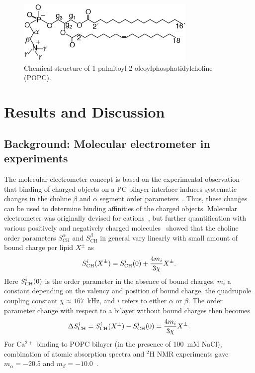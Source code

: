 \documentclass[pre,aps,floatfix,authordate1-4,twocolumn]{revtex4-1}
\begin{document}
\begin{figure}[]
  \centering
  \includegraphics[width=8.6cm]{../Fig/POPCstructure.eps}

  \caption{\label{POPCstructure}
    Chemical structure of 1-palmitoyl-2-oleoylphosphatidylcholine (POPC).}
  
\end{figure}





\section{Results and Discussion}

\subsection{Background: Molecular electrometer in experiments}\label{conceptinexperiments}
The molecular electrometer concept is based on the experimental observation that
binding of charged objects on a PC bilayer interface induces systematic changes in the choline $\beta$ and $\alpha$
segment order parameters~\cite{akutsu81,altenbach84,altenbach85,seelig87,macdonald87,scherer89,roux90,beschiasvili91,marassi92,rydall92}.
Thus, these changes can be used to determine binding affinities of the charged objects.
Molecular electrometer was originally devised for cations~\cite{akutsu81,altenbach84}, but
further quantification with various positively and negatively charged molecules~\cite{altenbach84,altenbach85,seelig87,macdonald87,scherer89,roux90,beschiasvili91,marassi92,rydall92}
showed that the choline order parameters $S_\mathrm{CH}^\alpha$ and $S_\mathrm{CH}^\beta$ in general vary linearly 
with small amount of bound charge per lipid $X^\pm$ as~\cite{ferreira16}
\begin{equation}\label{electrometer_eq}
S_{\rm{CH}}^{i}(X^\pm)=S_{\rm{CH}}^{i}(0) + \frac{4m_i}{3\chi} X^\pm.
\end{equation}
Here $S_{\rm{CH}}^{i}(0)$ is the order parameter in the absence of bound charges,
$m_i$ a constant depending on the valency and position of bound charge,
the quadrupole coupling constant $\chi \approx 167$~kHz, and
$i$ refers to either $\alpha$ or $\beta$.
The order parameter change with respect to a bilayer without bound charges then becomes
\begin{equation}\label{OPchangeEQ}
\Delta S_{\rm{CH}}^{i}= S_{\rm{CH}}^{i}(X^\pm)-S_{\rm{CH}}^{i}(0) =\frac{4m_i }{3\chi}X^\pm.
\end{equation}
For Ca$^{2+}$ binding to POPC bilayer (in the presence of 100~mM NaCl),
combination of atomic absorption spectra and $^2$H NMR experiments gave
$m_\alpha=-20.5$  and $m_\beta=-10.0$~\cite{altenbach84}.
\end{document}
